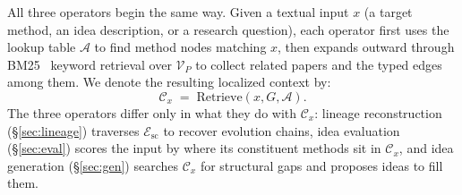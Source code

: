 \documentclass{llmxive}
\begin{document}
All three operators begin the same way. Given a textual input $x$ (a target method, an idea description, or a research
 question), each operator first uses the lookup table $\mathcal{A}$ to find method nodes matching $x$, then expands
outward through BM25~\cite{10.1561/1500000019} keyword retrieval over $\mathcal{V}_P$ to collect related papers and
the typed edges among them. We denote the resulting localized context by:
\begin{equation}
\mathcal{C}_x \;=\; \mathrm{Retrieve}(x, G, \mathcal{A}).
\label{eq:retrieve}
\end{equation}
The three operators differ only in what they do with $\mathcal{C}_x$: lineage reconstruction (§\ref{sec:lineage})
traverses $\mathcal{E}_{\text{sc}}$ to recover evolution chains, idea evaluation (§\ref{sec:eval}) scores the input by
 where its constituent methods sit in $\mathcal{C}_x$, and idea generation (§\ref{sec:gen}) searches $\mathcal{C}_x$
for structural gaps and proposes ideas to fill them.
\end{document}
